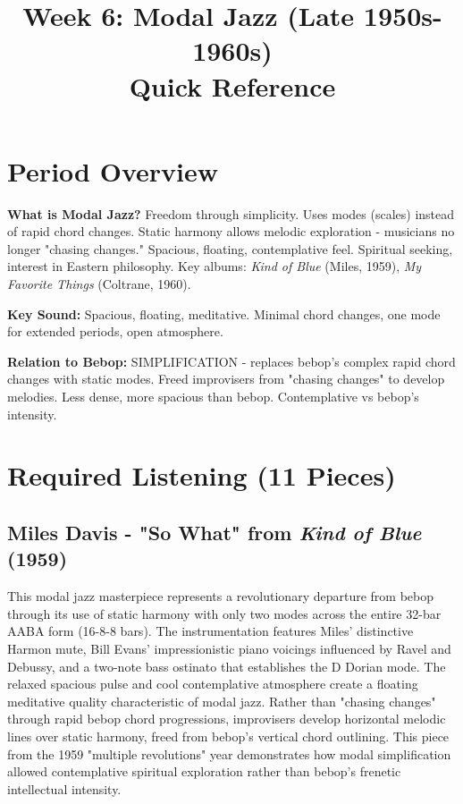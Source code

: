 \documentclass[11pt]{article}
\title{\textbf{Week 6: Modal Jazz (Late 1950s-1960s)} \\ \large Quick Reference}
\author{}
\date{}
\begin{document}
\maketitle

\section*{Period Overview}

\textbf{What is Modal Jazz?} Freedom through simplicity. Uses modes (scales) instead of rapid chord changes. Static harmony allows melodic exploration - musicians no longer "chasing changes." Spacious, floating, contemplative feel. Spiritual seeking, interest in Eastern philosophy. Key albums: \emph{Kind of Blue} (Miles, 1959), \emph{My Favorite Things} (Coltrane, 1960).

\textbf{Key Sound:} Spacious, floating, meditative. Minimal chord changes, one mode for extended periods, open atmosphere.

\textbf{Relation to Bebop:} SIMPLIFICATION - replaces bebop's complex rapid chord changes with static modes. Freed improvisers from "chasing changes" to develop melodies. Less dense, more spacious than bebop. Contemplative vs bebop's intensity.

\section*{Required Listening (11 Pieces)}

\subsection*{Miles Davis - "So What" from \emph{Kind of Blue} (1959)}
This modal jazz masterpiece represents a revolutionary departure from bebop through its use of static harmony with only two modes across the entire 32-bar AABA form (16-8-8 bars). The instrumentation features Miles' distinctive Harmon mute, Bill Evans' impressionistic piano voicings influenced by Ravel and Debussy, and a two-note bass ostinato that establishes the D Dorian mode. The relaxed spacious pulse and cool contemplative atmosphere create a floating meditative quality characteristic of modal jazz. Rather than "chasing changes" through rapid bebop chord progressions, improvisers develop horizontal melodic lines over static harmony, freed from bebop's vertical chord outlining. This piece from the 1959 "multiple revolutions" year demonstrates how modal simplification allowed contemplative spiritual exploration rather than bebop's frenetic intellectual intensity.
\end{document}
